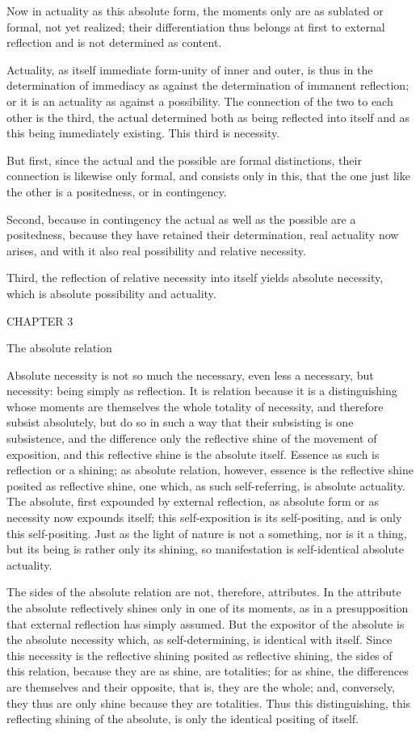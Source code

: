 Now in actuality as this absolute form,
the moments only are as sublated or formal, not yet realized;
their differentiation thus belongs at first to external reflection
and is not determined as content.

Actuality, as itself immediate form-unity of inner and outer,
is thus in the determination of immediacy
as against the determination of immanent reflection;
or it is an actuality as against a possibility.
The connection of the two to each other is the third,
the actual determined both as being reflected into itself
and as this being immediately existing.
This third is necessity.

But first, since the actual and the possible are formal distinctions,
their connection is likewise only formal, and consists only in this,
that the one just like the other is a positedness, or in contingency.

Second, because in contingency the actual
as well as the possible are a positedness,
because they have retained their determination,
real actuality now arises,
and with it also real possibility
and relative necessity.

Third, the reflection of relative necessity
into itself yields absolute necessity,
which is absolute possibility and actuality.

CHAPTER 3

The absolute relation

Absolute necessity is not so much the necessary,
even less a necessary, but necessity:
being simply as reflection.
It is relation because it is a distinguishing
whose moments are themselves the whole totality of necessity,
and therefore subsist absolutely,
but do so in such a way that their subsisting is one subsistence,
and the difference only the reflective shine of
the movement of exposition,
and this reflective shine is the absolute itself.
Essence as such is reflection or a shining;
as absolute relation, however, essence is the
reflective shine posited as reflective shine,
one which, as such self-referring, is absolute actuality.
The absolute, first expounded by external reflection,
as absolute form or as necessity now expounds itself;
this self-exposition is its self-positing,
and is only this self-positing.
Just as the light of nature is not a something,
nor is it a thing, but its being is rather only its shining,
so manifestation is self-identical absolute actuality.

The sides of the absolute relation are not, therefore, attributes.
In the attribute the absolute reflectively shines only in one of its moments,
as in a presupposition that external reflection has simply assumed.
But the expositor of the absolute is the absolute necessity
which, as self-determining, is identical with itself.
Since this necessity is the reflective shining
posited as reflective shining, the sides of this relation,
because they are as shine, are totalities;
for as shine, the differences are themselves and their opposite,
that is, they are the whole;
and, conversely, they thus are only shine because they are totalities.
Thus this distinguishing, this reflecting shining of the absolute,
is only the identical positing of itself.

